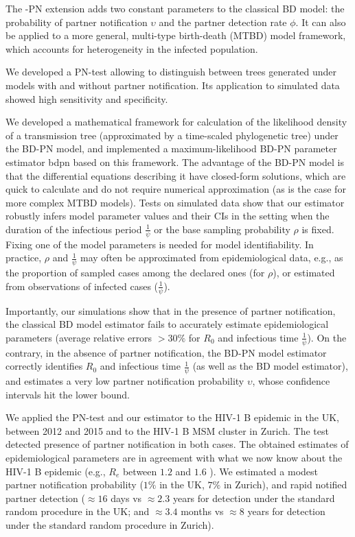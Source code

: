 \documentclass[10pt,letterpaper]{article}
\begin{document}
The -PN extension adds two constant parameters to the classical BD model: the probability of partner notification $\upsilon$ and the partner detection rate $\phi$. It can also be applied to a more general, multi-type birth-death (MTBD) model framework, which accounts for heterogeneity in the infected population. 

We developed a PN-test allowing to distinguish between trees generated under models with and without partner notification. Its application to simulated data showed high sensitivity and specificity. 

We developed a mathematical framework for calculation of the likelihood density of a transmission tree (approximated by a time-scaled phylogenetic tree) under the BD-PN model, and implemented a maximum-likelihood BD-PN parameter estimator bdpn based on this framework. The advantage of the BD-PN model is that the differential equations describing it have closed-form solutions, which are quick to calculate and do not require numerical approximation (as is the case for more complex MTBD models). Tests on simulated data show that our estimator robustly infers model parameter values and their CIs in the setting when the duration of the infectious period $\frac{1}{\psi}$ or the base sampling probability $\rho$ is fixed. Fixing one of the model parameters is needed for model identifiability. In practice, $\rho$ and $\frac{1}{\psi}$ may often be approximated from epidemiological data, e.g., as the proportion of sampled cases among the declared ones (for $\rho$), or estimated from observations of infected cases ($\frac{1}{\psi}$). 

Importantly, our simulations show that in the presence of partner notification, the classical BD model estimator fails to accurately estimate epidemiological parameters (average relative errors $> 30\%$ for $R_0$ and infectious time $\frac{1}{\psi}$). On the contrary, in the absence of partner notification, the BD-PN model estimator correctly identifies $R_0$ and infectious time $\frac{1}{\psi}$ (as well as the BD model estimator), and estimates a very low partner notification probability $\upsilon$, whose confidence intervals hit the lower bound.

We applied the PN-test and our estimator to the HIV-1 B epidemic in the UK, between 2012 and 2015 and to the HIV-1 B MSM cluster in Zurich. The test detected presence of partner notification in both cases. The obtained estimates of epidemiological parameters are in agreement with what we now know about the HIV-1 B epidemic (e.g., $R_e$ between $1.2$ and $1.6$ ). We estimated a modest partner notification probability ($1\%$ in the UK, $7\%$ in Zurich), and rapid notified partner detection ($\approx 16$ days vs $\approx 2.3$ years for detection under the standard random procedure in the UK; and $\approx 3.4$ months vs $\approx  8$ years for detection under the standard random procedure in Zurich).
\end{document}
